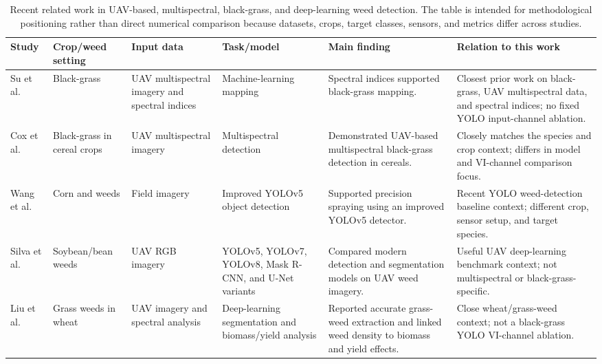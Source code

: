 \documentclass{ieeeaccess}
\begin{document}
\begin{table}[t]
    \centering
    \caption{Recent related work in UAV-based, multispectral, black-grass, and deep-learning weed detection. The table is intended for methodological positioning rather than direct numerical comparison because datasets, crops, target classes, sensors, and metrics differ across studies.}
    \label{tab:related_work}
    \scriptsize
    \setlength{\tabcolsep}{2pt}
    \renewcommand{\arraystretch}{1.08}
    \begin{tabular}{p{} p{} p{} p{} p{} p{}}
        \toprule
        \textbf{Study} & \textbf{Crop/weed setting} & \textbf{Input data} & \textbf{Task/model} & \textbf{Main finding} & \textbf{Relation to this work} \\
        \midrule
        Su et al.~\cite{su_spectral_2022} & Black-grass & UAV multispectral imagery and spectral indices & Machine-learning mapping & Spectral indices supported black-grass mapping. & Closest prior work on black-grass, UAV multispectral data, and spectral indices; no fixed YOLO input-channel ablation. \\
        Cox et al.~\cite{cox_black-grass_2023} & Black-grass in cereal crops & UAV multispectral imagery & Multispectral detection & Demonstrated UAV-based multispectral black-grass detection in cereals. & Closely matches the species and crop context; differs in model and VI-channel comparison focus. \\
        Wang et al.~\cite{10075447} & Corn and weeds & Field imagery & Improved YOLOv5 object detection & Supported precision spraying using an improved YOLOv5 detector. & Recent YOLO weed-detection baseline context; different crop, sensor setup, and target species. \\
        Silva et al.~\cite{silva_uav_deep_2024} & Soybean/bean weeds & UAV RGB imagery & YOLOv5, YOLOv7, YOLOv8, Mask R-CNN, and U-Net variants & Compared modern detection and segmentation models on UAV weed imagery. & Useful UAV deep-learning benchmark context; not multispectral or black-grass-specific. \\
        Liu et al.~\cite{liu_grass_weed_wheat_2024} & Grass weeds in wheat & UAV imagery and spectral analysis & Deep-learning segmentation and biomass/yield analysis & Reported accurate grass-weed extraction and linked weed density to biomass and yield effects. & Close wheat/grass-weed context; not a black-grass YOLO VI-channel ablation. \\

\end{tabular}
\end{table}
\end{document}
